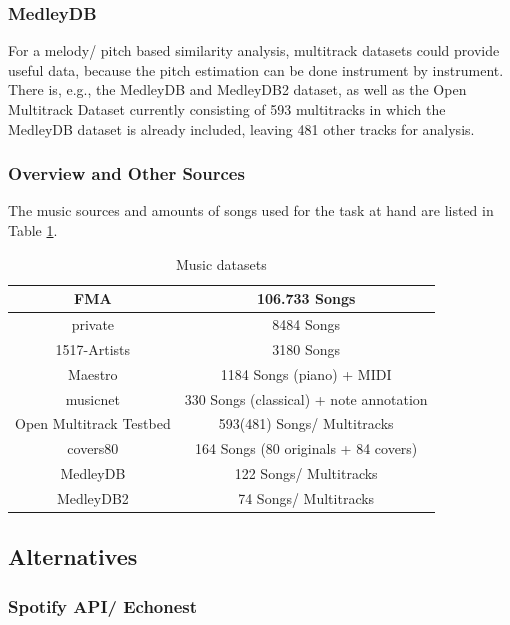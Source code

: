 \subsubsection{MedleyDB}

For a melody/ pitch based similarity analysis, multitrack datasets could provide useful data, because the pitch estimation can be done instrument by instrument. There is, e.g., the MedleyDB \cite{medleydb1} and MedleyDB2 \cite{medleydb2} dataset, as well as the Open Multitrack Dataset \cite{openmult1} currently consisting of 593 multitracks in which the MedleyDB dataset is already included, leaving 481 other tracks for analysis.

\subsubsection{Overview and Other Sources}

The music sources and amounts of songs used for the task at hand are listed in Table \ref{table_dsets}.

\begin{table}[h]
	\begin{center}
		\begin{tabular}{|c||c|}
			\hline
			FMA & 106.733 Songs\\
			\hline
			private & 8484 Songs\\
			\hline
			1517-Artists & 3180 Songs\\
			\hline
			Maestro & 1184 Songs (piano) + MIDI\\
			\hline
			musicnet & 330 Songs (classical) + note annotation\\
			\hline
			Open Multitrack Testbed & 593(481) Songs/ Multitracks\\
			\hline
			covers80 & 164 Songs (80 originals + 84 covers)\\
			\hline
			MedleyDB &  122 Songs/ Multitracks\\
			\hline
			MedleyDB2 &  74 Songs/ Multitracks\\
			\hline
		\end{tabular}
	\end{center}
	\caption{Music datasets}
	\label{table_dsets}
\end{table}
\FloatBarrier

\subsection{Alternatives}

\subsubsection{Spotify API/ Echonest}\label{spotipy}

